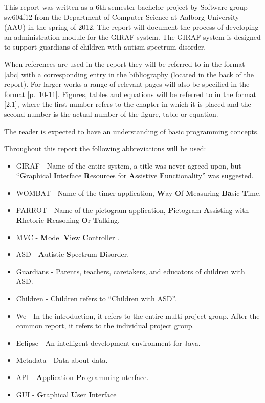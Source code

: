 This report was written as a 6th semester bachelor project by Software group sw604f12 from the Department of Computer Science at Aalborg University (AAU) in the spring of 2012. The report will document the process of developing an administration module for the GIRAF system. The GIRAF system is designed to support guardians of children with autism spectrum disorder.

When references are used in the report they will be referred to in the format [abc] with a corresponding entry in the bibliography (located in the back of the report). For larger works a range of relevant pages will also be specified in the format [p.~10-11]. Figures, tables and equations will be referred to in the format [2.1], where the first number refers to the chapter in which it is placed and the second number is the actual number of the figure, table or equation.

The reader is expected to have an understanding of basic programming concepts.

Throughout this report the following abbreviations will be used:

\begin{itemize}
	\item GIRAF - Name of the entire system, a title was never agreed upon, but ``\textbf{G}raphical
	\textbf{I}nterface \textbf{R}esources for \textbf{A}ssistive \textbf{F}unctionality'' was suggested.
	\item WOMBAT - Name of the timer application, \textbf{W}ay \textbf{O}f \textbf{M}easuring \textbf{Ba}sic \textbf{T}ime. 
	\item PARROT - Name of the pictogram application, \textbf{P}ictogram \textbf{A}ssisting with \textbf{R}hetoric \textbf{R}easoning \textbf{O}r \textbf{T}alking.
	\item MVC - \textbf{M}odel \textbf{V}iew \textbf{C}ontroller \cite{MVC}.
	\item ASD - \textbf{A}utistic \textbf{S}pectrum \textbf{D}isorder.
	\item Guardians - Parents, teachers, caretakers, and educators of children with ASD.
	\item Children - Children refers to ``Children with ASD''.
	\item We - In the introduction, it refers to the entire multi project group. After the common report, it refers to the individual project group.
	\item Eclipse - An intelligent development environment for Java.
	\item Metadata - Data about data.
	\item API - \textbf{A}pplication \textbf{P}rogramming nterface.
	\item GUI - \textbf{G}raphical \textbf{U}ser \textbf{I}nterface
\end{itemize}

